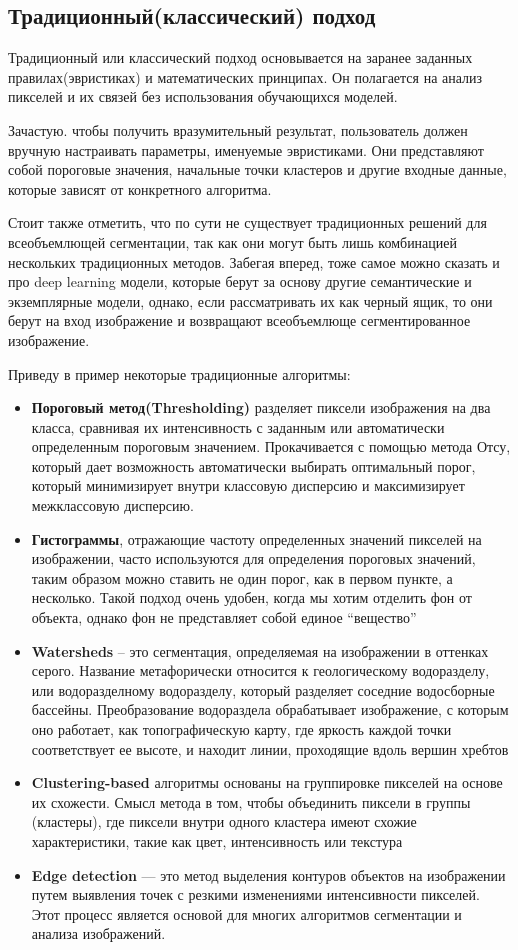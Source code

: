 \subsection{Традиционный(классический) подход}
Традиционный или классический подход основывается на заранее заданных правилах(эвристиках) и математических принципах. Он полагается на анализ пикселей и их связей без использования обучающихся моделей.

Зачастую. чтобы получить вразумительный результат, пользователь должен вручную настраивать параметры, именуемые эвристиками. Они представляют собой пороговые значения, начальные точки кластеров и другие входные данные, которые зависят от конкретного алгоритма.

Стоит также отметить, что по сути не существует традиционных решений для всеобъемлющей сегментации, так как они могут быть лишь комбинацией нескольких традиционных методов. Забегая вперед, тоже самое можно сказать и про deep learning модели, которые берут за основу другие семантические и экземплярные модели, однако, если рассматривать их как черный ящик, то они берут на вход изображение и возвращают всеобъемлюще сегментированное изображение.

Приведу в пример некоторые традиционные алгоритмы:

\begin{itemize}
    \item \textbf{Пороговый метод(Thresholding)} разделяет пиксели изображения на два класса, сравнивая их интенсивность с заданным или автоматически определенным пороговым значением. Прокачивается с помощью метода Отсу, который дает возможность автоматически выбирать оптимальный порог, который минимизирует внутри классовую дисперсию и максимизирует межклассовую дисперсию.
    \item \textbf{Гистограммы}, отражающие частоту определенных значений пикселей на изображении, часто используются для определения пороговых значений, таким образом можно ставить не один порог, как в первом пункте, а несколько. Такой подход очень удобен, когда мы хотим отделить фон от объекта, однако фон не представляет собой единое “вещество”
    \item \textbf{Watersheds} – это сегментация, определяемая на изображении в оттенках серого. Название метафорически относится к геологическому водоразделу, или водоразделному водоразделу, который разделяет соседние водосборные бассейны. Преобразование водораздела обрабатывает изображение, с которым оно работает, как топографическую карту, где яркость каждой точки соответствует ее высоте, и находит линии, проходящие вдоль вершин хребтов
    \item \textbf{Clustering-based} алгоритмы основаны на группировке пикселей на основе их схожести. Смысл метода в том, чтобы объединить пиксели в группы (кластеры), где пиксели внутри одного кластера имеют схожие характеристики, такие как цвет, интенсивность или текстура
    \item \textbf{Edge detection} — это метод выделения контуров объектов на изображении путем выявления точек с резкими изменениями интенсивности пикселей. Этот процесс является основой для многих алгоритмов сегментации и анализа изображений.
\end{itemize}

